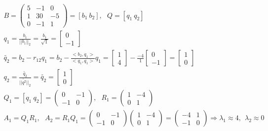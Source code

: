 \documentclass[12pt]{article}
\begin{document}
    \begin{gather*}
        B = \begin{pmatrix}
            5 & -1 & 0\\
            1 & 30 & -5\\
            0 & -1 & 1
        \end{pmatrix}
        = [b_1 ~ b_2], ~~~ Q = [q_1 ~ q_2]\\
        q_1 = \frac{b_1}{||b_1||_2} = \frac{b_1}{\sqrt{1}} =
        \begin{bmatrix}
            0\\
            -1
        \end{bmatrix}\\
        \tilde{q_2} = b_2 - r_{12} q_1 = b_2 - \frac{<b_2, q_1>}{<q_1, q_1>} q_1 =
        \begin{bmatrix}
            1\\
            4
        \end{bmatrix}
        - \frac{-4}{1}
        \begin{bmatrix}
            0\\
            -1
        \end{bmatrix} =
        \begin{bmatrix}
            1\\
            0
        \end{bmatrix}\\
        q_2 = \frac{\tilde{q_2}}{||\tilde{q^2}||_2} = \tilde{q_2} =
        \begin{bmatrix} 1\\
            0
        \end{bmatrix}\\
        Q_1 = [q_1 ~ q_2] =
        \begin{pmatrix}
            0 & -1\\
            -1 & 0
        \end{pmatrix}, ~~~
        R_1 =
        \begin{pmatrix}
            1 & -4\\
            0 & 1
        \end{pmatrix}\\
        A_1 = Q_1 R_1, ~~~ A_2 = R_1 Q_1 =
        \begin{pmatrix}
            0 & -1\\
            -1 & 0
        \end{pmatrix}
        \begin{pmatrix}
            1 & -4\\
            0 & 1
        \end{pmatrix}
        =
        \begin{pmatrix}
            -4 & 1\\
            -1 & 0
        \end{pmatrix}
        \Rightarrow
        \lambda_1 \approx 4, ~~ \lambda_2 \approx 0
    \end{gather*}
\end{document}
